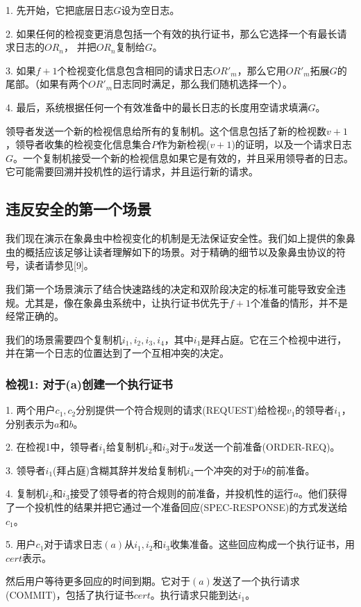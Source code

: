 \documentclass[UTF8]{ctexart}
\begin{document}
1. 先开始，它把底层日志$G$设为空日志。

2. 如果任何的检视变更消息包括一个有效的执行证书，那么它选择一个有最长请求日志的$OR_n$， 并把$OR_n$复制给$G$。

3. 如果$f + 1$个检视变化信息包含相同的请求日志$OR'_m$，那么它用$OR'_m$拓展$G$的尾部。（如果有两个$OR'_m$日志同时满足，那么我们随机选择一个）。

4. 最后，系统根据任何一个有效准备中的最长日志的长度用空请求填满$G$。


领导者发送一个新的检视信息给所有的复制机。这个信息包括了新的检视数$v + 1$，领导者收集的检视变化信息集合$P$作为新检视($v + 1$)的证明，以及一个请求日志$G$。一个复制机接受一个新的检视信息如果它是有效的，并且采用领导者的日志。它可能需要回溯并投机性的运行请求，并且运行新的请求。

\subsection{违反安全的第一个场景}
我们现在演示在象鼻虫中检视变化的机制是无法保证安全性。我们如上提供的象鼻虫的概括应该足够让读者理解如下的场景。对于精确的细节以及象鼻虫协议的符号，读者请参见[9]。

我们第一个场景演示了结合快速路线的决定和双阶段决定的标准可能导致安全违规。尤其是，像在象鼻虫系统中，让执行证书优先于$f + 1$个准备的情形，并不是经常正确的。

我们的场景需要四个复制机$i_1, i_2, i_3, i_4$，其中$i_1$是拜占庭。它在三个检视中进行，并在第一个日志的位置达到了一个互相冲突的决定。

\subsubsection*{检视1: 对于(a)创建一个执行证书}
1. 两个用户$c_1, c_2$分别提供一个符合规则的请求(REQUEST)给检视$v_1$的领导者$i_1$，分别表示为$a$和$b$。

2. 在检视1中，领导者$i_1$给复制机$i_2$和$i_3$对于$a$发送一个前准备(ORDER-REQ)。

3. 领导者$i_1$(拜占庭)含糊其辞并发给复制机$i_4$一个冲突的对于$b$的前准备。

4. 复制机$i_2$和$i_3$接受了领导者的符合规则的前准备，并投机性的运行$a$。他们获得了一个投机性的结果并把它通过一个准备回应(SPEC-RESPONSE)的方式发送给$c_1$。

5. 用户$c_1$对于请求日志$(a)$从$i_1, i_2$和$i_3$收集准备。这些回应构成一个执行证书，用$cert$表示。

然后用户等待更多回应的时间到期。它对于$(a)$发送了一个执行请求(COMMIT)，包括了执行证书$cert$。执行请求只能到达$i_1$。
\end{document}
